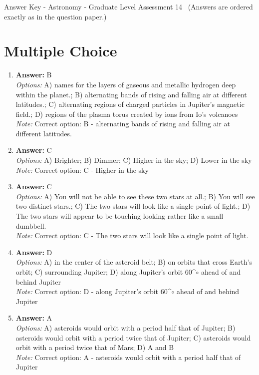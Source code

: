 \documentclass[12pt]{article}
\begin{document}
\begin{center}
Answer Key - Astronomy - Graduate Level Assessment 14 \
\small (Answers are ordered exactly as in the question paper.)
\end{center}

\section*{Multiple Choice}
\begin{enumerate}[label=\arabic*.]
\item \textbf{Answer:} B
\\ \textit{Options:} A) names for the layers of gaseous and metallic hydrogen deep within the planet.; B) alternating bands of rising and falling air at different latitudes.; C) alternating regions of charged particles in Jupiter's magnetic field.; D) regions of the plasma torus created by ions from Io's volcanoes
\\ \textit{Note:} Correct option: B - alternating bands of rising and falling air at different latitudes.
\item \textbf{Answer:} C
\\ \textit{Options:} A) Brighter; B) Dimmer; C) Higher in the sky; D) Lower in the sky
\\ \textit{Note:} Correct option: C - Higher in the sky
\item \textbf{Answer:} C
\\ \textit{Options:} A) You will not be able to see these two stars at all.; B) You will see two distinct stars.; C) The two stars will look like a single point of light.; D) The two stars will appear to be touching looking rather like a small dumbbell.
\\ \textit{Note:} Correct option: C - The two stars will look like a single point of light.
\item \textbf{Answer:} D
\\ \textit{Options:} A) in the center of the asteroid belt; B) on orbits that cross Earth's orbit; C) surrounding Jupiter; D) along Jupiter's orbit 60^\ensuremath{\circ} ahead of and behind Jupiter
\\ \textit{Note:} Correct option: D - along Jupiter's orbit 60^\ensuremath{\circ} ahead of and behind Jupiter
\item \textbf{Answer:} A
\\ \textit{Options:} A) asteroids would orbit with a period half that of Jupiter; B) asteroids would orbit with a period twice that of Jupiter; C) asteroids would orbit with a period twice that of Mars; D) A and B
\\ \textit{Note:} Correct option: A - asteroids would orbit with a period half that of Jupiter
\end{enumerate}
\end{document}
